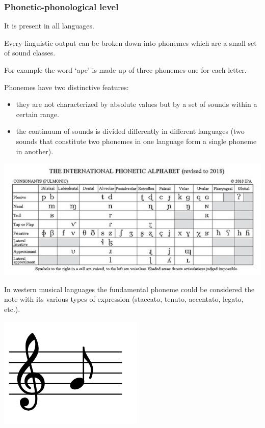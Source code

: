 \subsubsection{Phonetic-phonological level }\label{phonetic-phonological-level}

It is present in all languages.

Every linguistic output can be broken down into phonemes which are a small set of sound classes.

For example the word `ape' is made up of three phonemes one for each letter.

Phonemes have two distinctive features: 

\begin{itemize}
\tightlist
\item they are not characterized by absolute values but by a set of sounds within a certain range. 
\item the continuum of sounds is divided differently in different languages (two sounds that constitute two phonemes in one language form a single phoneme in another).
\end{itemize}

\begin{center}
\includegraphics[scale=0.9]{../img/fonemi_2.png}
\end{center}

In western musical languages the fundamental phoneme could be considered the note with its various types of expression (staccato, tenuto, accentato, legato, etc.).

\begin{center}
\includegraphics[scale=0.22]{../img/nota.png}
\end{center}

